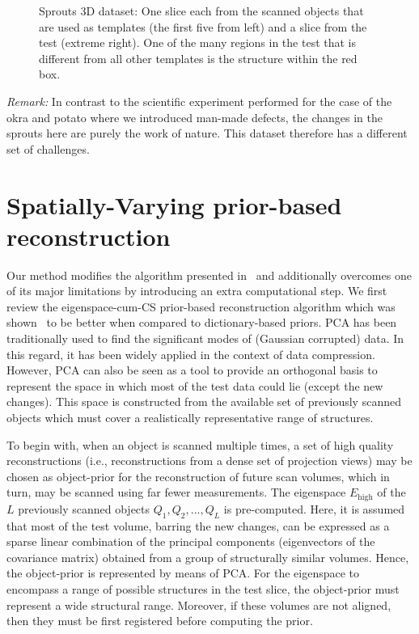 \documentclass[journal]{IEEEtran}
\begin{document}
\begin{figure}[!h]
\begin{subfigure}[b]{0.29\linewidth}
\captionsetup{labelformat=empty}
        \caption{}
     \end{subfigure}
      \caption{Sprouts 3D dataset: One slice each from the scanned
        objects that are used as templates (the first five from
        left) and a slice from the test (extreme right). One of the
        many regions in the test that is different from all other
        templates is the structure within the red box.}
\label{fig:object-prior_test_sprouts}
\addtolength{\textfloatsep}{-0.8cm}
\end{figure}

\textit{Remark:} In contrast to the scientific experiment performed
for the case of the okra and potato where we introduced man-made
defects, the changes in the sprouts here are purely the work of
nature. This dataset therefore has a different set of challenges.

\section{Spatially-Varying prior-based reconstruction}
\label{sec:method_spatially_varying_prior}
Our method modifies the algorithm presented in~\cite{my_dicta_paper}
and additionally overcomes one of its major limitations by introducing
an extra computational step. We first review the eigenspace-cum-CS
prior-based reconstruction algorithm which was
shown~\cite{my_dicta_paper} to be better when compared to
dictionary-based priors. PCA has been traditionally used
to find the significant modes of (Gaussian corrupted) data. In this
regard, it has been widely applied in the context of data
compression. However, PCA can also be seen as a tool to provide an
orthogonal basis to represent the space in which most of the test data
could lie (except the new changes). This space is constructed from the
available set of previously scanned objects which must cover a
realistically representative range of structures. %

To begin with,
when an object is scanned multiple times, a set of high quality
reconstructions (i.e., reconstructions from a dense set of
projection views) may be chosen as object-prior for the reconstruction
of future scan volumes, which in turn, may be scanned using far fewer
measurements. The eigenspace $E_{\text{high}}$ of the $L$ previously
scanned objects $Q_1,Q_2,...,Q_L$ is pre-computed. Here, it is assumed
that most of the test volume, barring the new changes, can be
expressed as a sparse linear combination of the principal components
(eigenvectors of the covariance matrix) obtained from a group of
structurally similar volumes. Hence, the object-prior is represented
by means of PCA. For the eigenspace to encompass a range of possible
structures in the test slice, the object-prior must represent a wide
structural range. Moreover, if these volumes are not aligned, then
they must be first registered before computing the prior.
\end{document}
